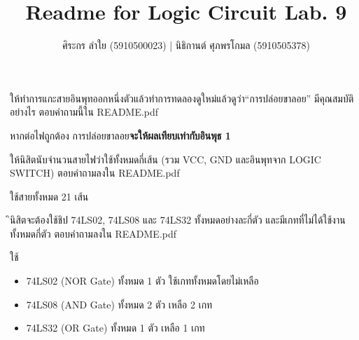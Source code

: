 \documentclass{exam}
\title{Readme for Logic Circuit Lab. 9}
\author{ศิระกร ลำใย (5910500023) | นิธิกานต์ ศุภพรโกมล (5910505378)}
\begin{document}
\maketitle

\begin{questions}

\question  ให้ทําการแกะสายอินพุทออกหนึ่งตัวแล้วทําการทดลองดูใหม่แล้วดูว่า“การปล่อยขาลอย” มีคุณสมบัติอย่างไร ตอบคําถามนี้ใน README.pdf

\begin{solution}[.2in]
หากต่อไฟถูกต้อง การปล่อยขาลอย\textbf{จะให้ผลเทียบเท่ากับอินพุธ 1}
\end{solution}

\question ให้นิสิตนับจํานวนสายไฟว่าใช้ทั้งหมดกี่เส้น (รวม VCC, GND และอินพุทจาก LOGIC SWITCH) ตอบคําถามลงใน README.pdf

\begin{solution}[.2in]
ใช้สายทั้งหมด 21 เส้น
\end{solution}

\question ินิสิตจะต้องใช้ชิป 74LS02, 74LS08 และ 74LS32 ทั้งหมดอย่างละกี่ตัว และมีเกทที่ไม่ได้ใช้งานทั้งหมดกี่ตัว ตอบคําถามลงใน README.pdf

\begin{solution}[.2in]
ใช้
\begin{itemize}
\item 74LS02 (NOR Gate) ทั้งหมด 1 ตัว ใช้เกททั้งหมดโดยไม่เหลือ
\item 74LS08 (AND Gate) ทั้งหมด 2 ตัว เหลือ 2 เกท
\item 74LS32 (OR Gate) ทั้งหมด 1 ตัว เหลือ 1 เกท
\end{itemize}
\end{solution}

\end{questions}
\end{document}

